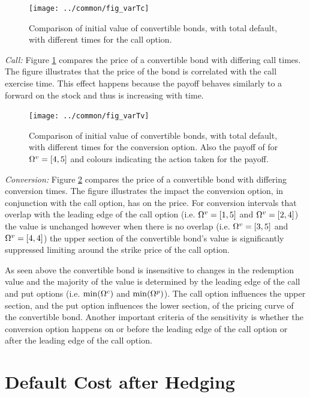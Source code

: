 \documentclass[a4paper,11pt,oneside]{report}
\theoremstyle{plain}
\theoremstyle{definition}
\begin{document}
\begin{figure}[hb!]
 \centering
 \texttt{[image: ../common/fig\_varTc]}
 \caption[Varying Call Time]{Comparison of initial value of convertible bonds, with total default, with different times for the call option.}
 \label{fig:varTc}
\end{figure}

\emph{Call:} Figure \ref{fig:varTc} compares the price of a convertible bond with differing call times.  The figure illustrates that the price of the bond is correlated with the call exercise time.  This effect happens because the payoff behaves similarly to a forward on the stock and thus is increasing with time.

\begin{figure}[hb!]
 \centering
 \texttt{[image: ../common/fig\_varTv]}
 \caption[Varying Conversion Time]{Comparison of initial value of convertible bonds, with total default, with different times for the conversion option.  Also the payoff of for $\Omega^{v} = [4, 5]$ and colours indicating the action taken for the payoff.}
 \label{fig:varTv}
\end{figure}

\emph{Conversion:} Figure \ref{fig:varTv} compares the price of a convertible bond with differing conversion times.  The figure illustrates the impact the conversion option, in conjunction with the call option, has on the price.  For conversion intervals that overlap with the leading edge of the call option (i.e. $\Omega^{v} = [1, 5]$ and $\Omega^{v} = [2, 4]$) the value is unchanged however when there is no overlap (i.e. $\Omega^{v} = [3, 5]$ and $\Omega^{v} = [4, 4]$) the upper section of the convertible bond's value is significantly suppressed limiting around the strike price of the call option.

As seen above the convertible bond is insensitive to changes in the redemption value and the majority of the value is determined by the leading edge of the call and put options (i.e. $\min(\Omega^{c})$ and $\min(\Omega^{p})$).  The call option influences the upper section, and the put option influences the lower section, of the pricing curve of the convertible bond.  Another important criteria of the sensitivity is whether the conversion option happens on or before the leading edge of the call option or after the leading edge of the call option.


\section{Default Cost after Hedging}
\end{document}
